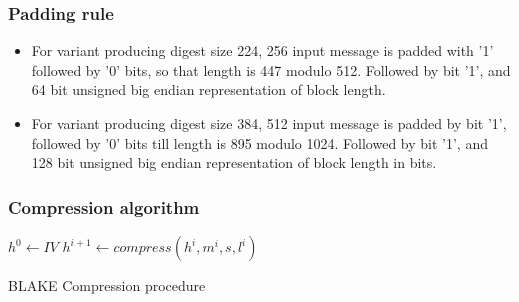 \documentclass{beamer}
\begin{document}
\begin{frame}
\frametitle{Padding rule}
\begin{itemize}
\item For variant producing digest size 224, 256 input message is padded with '1' followed by '0' bits,
so that length is 447 modulo 512. Followed by bit '1', and 64 bit unsigned big endian representation 
of block length. 
\item For variant producing digest size 384, 512 input message is padded by bit '1', followed by '0' bits
till length is 895 modulo 1024. Followed by bit '1', and 128 bit unsigned big endian representation of 
block length in bits.
\end{itemize}
\end{frame}

\begin{frame}[fragile]
\frametitle{Compression algorithm}
  \begin{algorithm}[H]
  \begin{algorithmic}[1]
    \State $ h^{0} \gets IV $
      \State $h^{i+1} \gets compress(h^{i}, m^{i}, s, l^{i})$
    \EndFor
    \State{}
  \end{algorithmic}
  \caption[BLAKE Compression]{BLAKE Compression procedure\footnotemark}
  \label{alg:seq}
  \end{algorithm}
\end{frame}
\end{document}
